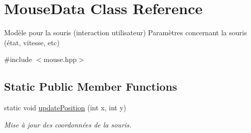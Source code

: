 \hypertarget{class_mouse_data}{}\section{Mouse\+Data Class Reference}
\label{class_mouse_data}


Modèle pour la souris (interaction utilisateur) Paramètres concernant la souris (état, vitesse, etc)  




{\ttfamily \#include $<$mouse.\+hpp$>$}

\subsection*{Static Public Member Functions}
\begin{DoxyCompactItemize}
\item 
static void \hyperlink{class_mouse_data_aee9c88eaf22f3ca6dce4d12ac60604b3}{update\+Position} (int x, int y)
\begin{DoxyCompactList}\small\item\em Mise à jour des coordonnées de la souris. \end{DoxyCompactList}\end{DoxyCompactItemize}
